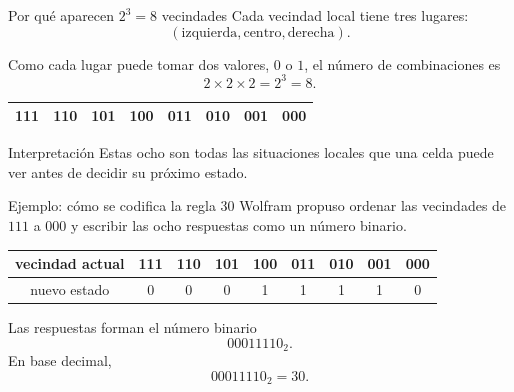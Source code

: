 \begin{frame}{Por qué aparecen $2^3=8$ vecindades}
\small
Cada vecindad local tiene tres lugares:
\[
(\text{izquierda},\text{centro},\text{derecha}).
\]

Como cada lugar puede tomar dos valores, $0$ o $1$, el número de combinaciones es
\[
2\times 2\times 2 = 2^3 = 8.
\]

\begin{center}
\begin{tabular}{cccccccc}
\toprule
111 & 110 & 101 & 100 & 011 & 010 & 001 & 000 \\
\bottomrule
\end{tabular}
\end{center}

\begin{block}{Interpretación}
Estas ocho son todas las situaciones locales que una celda puede ver antes de decidir su próximo estado.
\end{block}
\end{frame}

\begin{frame}{Ejemplo: cómo se codifica la regla 30}
\small
Wolfram propuso ordenar las vecindades de $111$ a $000$ y escribir las ocho respuestas como un número binario.

\begin{center}
\begin{tabular}{c|cccccccc}
\toprule
vecindad actual & 111 & 110 & 101 & 100 & 011 & 010 & 001 & 000 \\
\midrule
nuevo estado   & 0   & 0   & 0   & 1   & 1   & 1   & 1   & 0   \\
\bottomrule
\end{tabular}
\end{center}

Las respuestas forman el número binario
\[
00011110_2.
\]
En base decimal,
\[
00011110_2 = 30.
\]
\end{frame}

